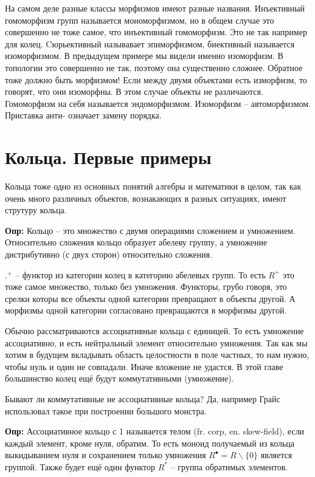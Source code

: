 На самом деле разные классы морфизмов имеют разные названия. Инъективный
гомоморфизм групп называется мономорфизмом, но в общем случае это совершенно
не тоже самое, что инъективный гомоморфизм. Это не так например для колец.
Cюрьективный называвает эпиморфизмом, биективный называется изоморфизмом. В
предыдущем примере мы видели именно изоморфизм. В топологии это совершенно не
так, поэтому она существенно сложнее. Обратное тоже должно быть морфизмом! Если
между двумя объектами есть изморфизм, то говорят, что они изоморфны. В этом
случае объекты не различаются. Гомоморфизм на себя называется эндоморфизмом.
Изоморфизм – автоморфизмом. Приставка анти- означает замену порядка.

\section{Кольца. Первые примеры}

Кольца тоже одно из основных понятий алгебры и математики в целом, так как
очень много различных объектов, вознакающих в разных ситуациях, имеют струтуру
кольца.

\textbf{Опр:} Кольцо – это множество с двумя операциями сложением и умножением.
Относительно сложения кольцо образует абелеву группу, а умножение дистрибутивно
(с двух сторон) относительно сложения.

$.^+$ – функтор из категории колец в категорию абелевых групп. То есть $R^+$
это тоже самое множество, только без умножения. Функторы, грубо говоря, это
срелки которы все объекты одной категории превращают в объекты другой. А
морфизмы одной категории согласовано превращаются в морфизмы другой.

Обычно рассматриваются ассоциативные кольца с единицей. То есть умножение
ассоциативно, и есть нейтральный элемент относительно умножения. Так как мы
хотим в будущем вкладывать область целостности в поле частных, то нам нужно,
чтобы нуль и один не совпадали. Иначе вложение не удастся. В этой главе
большинство колец ещё будут коммутативными (умножение).

Бывают ли коммутативные не ассоциативные кольца? Да, например Грайс использовал
такое при построении большого монстра.

\textbf{Опр:} Ассоциативное кольцо с 1 называется телом (fr. corp, en. skew-field),
если каждый элемент, кроме нуля, обратим. То есть моноид получаемый из кольца
выкидыванием нуля и сохранением только умножения $R^\bullet = R\backslash\{0\}$ является
группой. Также будет ещё один функтор $R^*$ – группа обратимых элементов.

